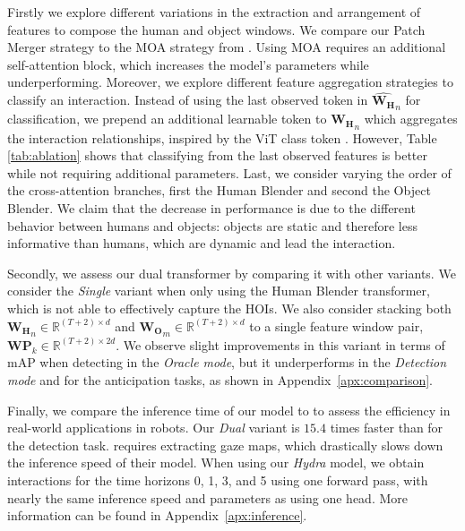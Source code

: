 \documentclass{article}
\begin{document}
Firstly we explore different variations in the extraction and arrangement of features to compose the human and object windows. We compare our Patch Merger strategy to the MOA strategy from \citep{park2023viplo}. Using MOA requires an additional self-attention block, which increases the model's parameters while underperforming. Moreover, we explore different feature aggregation strategies to classify an interaction. Instead of using the last observed token in $\widehat{\mathbf{W_H}}_{n}$ for classification, we prepend an additional learnable token to $\mathbf{W_H}_{n}$ which aggregates the interaction relationships, inspired by the ViT class token \citep{dosovitskiy2020vit}. However, Table \ref{tab:ablation} shows that classifying from the last observed features is better while not requiring additional parameters. Last, we consider varying the order of the cross-attention branches, first the Human Blender and second the Object Blender. We claim that the decrease in performance is due to the different behavior between humans and objects: objects are static and therefore less informative than humans, which are dynamic and lead the interaction.



Secondly, we assess our dual transformer by comparing it with other variants. We consider the \textit{Single} variant when only using the Human Blender transformer, which is not able to effectively capture the HOIs. We also consider stacking both $\mathbf{W_H}_{n} \in \mathbb{R}^{(T+2)\times d}$ and $\mathbf{W_O}_{m} \in \mathbb{R}^{(T+2)\times d}$ to a single feature window pair, $\mathbf{WP}_k \in \mathbb{R}^{(T+2)\times 2d}$. 
We observe slight improvements in this variant in terms of mAP when detecting in the \textit{Oracle mode}, but it underperforms in the \textit{Detection mode} and for the anticipation tasks, as shown in Appendix~\ref{apx:comparison}.

Finally, we compare the inference time of our model to \citep{NI2023103741}  to assess the efficiency in real-world applications in robots. Our \textit{Dual} variant is $15.4$ times faster than \citep{NI2023103741} for the detection task. \citep{NI2023103741} requires extracting gaze maps, which drastically slows down the inference speed of their model. When using our \textit{Hydra} model, we obtain interactions for the time horizons 0, 1, 3, and 5 using one forward pass, with nearly the same inference speed and parameters as using one head. More information can be found in Appendix~\ref{apx:inference}.
\end{document}
